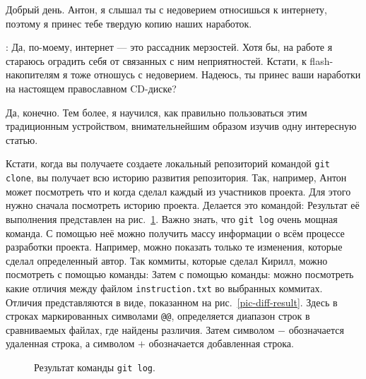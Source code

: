 \documentclass[14pt,a4paper]{article}
\begin{document}

 Добрый день. Антон, я слышал ты с недоверием относишься к интернету, поэтому я принес
тебе твердую копию наших наработок. 

: Да, по-моему, интернет --- это рассадник мерзостей. 
Хотя бы, на работе я стараюсь оградить себя от связанных с ним неприятностей. 
Кстати, к flash-накопителям я тоже отношусь с недоверием. Надеюсь, ты принес ваши наработки
на настоящем православном CD-диске? 

 Да, конечно. Тем более, я научился, как правильно пользоваться
этим традиционным устройством, внимательнейшим образом изучив одну интересную статью.



 Кстати, когда вы получаете создаете локальный репозиторий командой \texttt{git clone}, 
вы получает всю историю развития репозитория. Так, например, Антон может посмотреть что и когда 
сделал каждый из участников проекта. Для этого нужно сначала посмотреть историю проекта.
Делается это командой:  Результат её выполнения представлен
на рис.~\ref{pic-git-log}.
Важно знать, что \texttt{git log} очень мощная команда. С помощью неё можно получить массу информации
о всём процессе разработки проекта. Например, можно показать только те изменения, которые сделал 
определенный автор. Так коммиты, которые сделал Кирилл, можно посмотреть с помощью команды:
Затем с помощью команды:
можно посмотреть какие отличия между файлом \texttt{instruction.txt} во выбранных коммитах.
Отличия представляются в виде, показанном на рис.~\ref{pic-diff-result}.
Здесь в строках маркированных символами \texttt{@@}, определяется диапазон строк в сравниваемых
файлах, где найдены различия. Затем символом $-$ обозначается удаленная строка, а символом $+$
обозначается добавленная строка. 
\begin{figure}
	\centering
	\caption{Результат команды \texttt{git log}.}
	\label{pic-git-log}
\end{figure}
\end{document}
